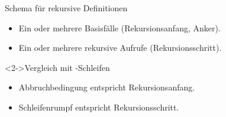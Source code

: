\begin{fframe}
    \begin{block}{Schema für rekursive Definitionen}
    \begin{itemize}
        \item Ein oder mehrere Basisfälle (Rekursionsanfang, Anker).
        \item Ein oder mehrere rekursive Aufrufe (Rekursionsschritt).
    \end{itemize}
    \end{block}
    \begin{block}<2->{Vergleich mit -Schleifen}
    \begin{itemize}
        \item Abbruchbedingung entspricht Rekursionsanfang.
        \item Schleifenrumpf entspricht Rekursionsschritt.
    \end{itemize}
    \end{block}
\end{fframe}
